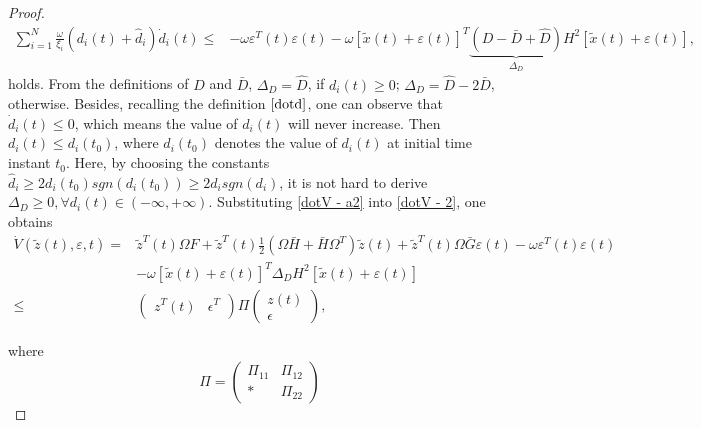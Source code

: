 \documentclass[review]{elsarticle}
\begin{document}
\begin{proof}
	\begin{equation} \label{dotV - a2} 
	\begin{split}
	\sum_{i=1}^{N} \frac{\omega}{\xi_i}(d_i (t) + \hat{d}_i) \dot d_i (t) %
	\leq&	- \omega \varepsilon^T(t) \varepsilon(t) -\omega\left[\tilde{x} (t) + \varepsilon(t) \right]^T\underbrace{(D-\bar{D}+\hat D)}_{\Delta_D}  H^2 \left[\tilde{x} (t) + \varepsilon(t) \right],
	\end{split}
	\end{equation} 
	holds. From the definitions of $D$ and $\bar D$, $\Delta_D=\hat D$, if $ d_i(t)\geq 0$; $\Delta_D = \hat D-2\bar D$, otherwise. 
	Besides, recalling the definition $\eqref{dotd}$, one can observe that $\dot{d}_i(t)\leq 0$, which means the value of $d_i(t)$ will never increase. Then $d_i(t)\leq d_i(t_0)$, where $d_i(t_0)$ denotes the value of $d_i(t)$ at initial time instant $t_0$. Here, by choosing the constants $\hat{d}_i\geq 2 d_i(t_0)sgn(d_i(t_0))\geq 2d_isgn(d_i)$, it is not hard to derive $\Delta_D\geq 0, \forall d_i(t)\in (-\infty,+\infty)$. 
	Substituting \eqref{dotV - a2} into \eqref{dotV - 2}, one obtains
	\begin{equation}\label{5-a}
	\begin{split}
	\dot V(\tilde z(t) ,\varepsilon, t) 
	=&	\tilde{z}^T(t) \Omega F + \tilde{z}^T(t) \frac{1}{2}\left(\Omega \bar{H}+ \bar{H}\Omega^T \right) \tilde{z}(t)+\tilde{z}^T(t) \Omega \bar{G} \varepsilon(t)- \omega \varepsilon^T(t)  \varepsilon(t)  \\
	&-\omega\left[\tilde{x} (t) + \varepsilon(t) \right]^T\Delta_D  H^2 \left[\tilde{x} (t)  + \varepsilon(t) \right]\\ %
	\leq &\begin{pmatrix}
	z^T(t)&\epsilon^T
	\end{pmatrix}\Pi\begin{pmatrix}
	z(t)\\\epsilon
	\end{pmatrix}   ,
	\end{split}
	\end{equation}%
	
	where 
	$$
	\Pi = \begin{pmatrix}
	\Pi_{11}&\Pi_{12}\\
	*& \Pi_{22}
	
	\end{pmatrix}
	$$
	

\end{proof}
\end{document}
